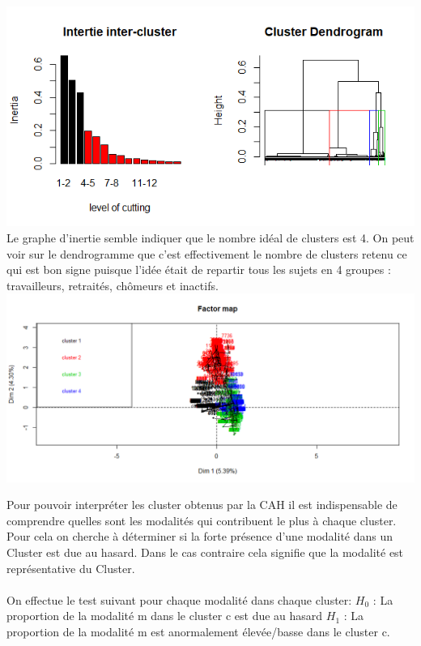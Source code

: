 \documentclass{book}
\begin{document}
\includegraphics[scale = 1]{dendro_inertie_cah.png}\\
Le graphe d'inertie semble indiquer que le nombre idéal de clusters est 4. On peut voir sur le dendrogramme que c'est effectivement le nombre de clusters retenu ce qui est bon signe puisque l'idée était de repartir tous les sujets en 4 groupes : travailleurs, retraités, chômeurs et inactifs.
\includegraphics[scale = .5]{cah_ind_cluster.png}

Pour pouvoir interpréter les cluster obtenus par la CAH il est indispensable de comprendre quelles sont les modalités qui contribuent le plus à chaque cluster.\\
Pour cela on cherche à déterminer si la forte présence d'une modalité dans un Cluster est due au hasard. Dans le cas contraire cela signifie que la modalité est représentative du Cluster.\\\\

On effectue le test suivant pour chaque modalité dans chaque cluster:
\noindent 
$H_0$ : La proportion de la modalité m dans le cluster c est due au hasard
\noindent
$H_1$ : La proportion de la modalité m est anormalement élevée/basse dans le cluster c.\\
\end{document}
